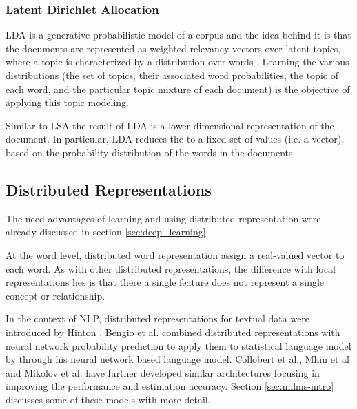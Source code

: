 \subsubsection{Latent Dirichlet Allocation}
 \label{sec:rel_lda}
\ac{LDA} is a generative probabilistic model of a corpus and the
idea behind it is that the documents are represented as weighted relevancy
vectors over latent topics, where a topic is characterized by a distribution over
words \cite{Blei:2003:LDA:944919.944937}.
Learning the various distributions (the set of topics, their associated word
probabilities, the topic of each word, and the particular topic mixture of
each document) is the objective of applying this topic modeling.

Similar to \ac{LSA} the result of \ac{LDA} is a lower dimensional
representation of the document. In particular, LDA
reduces the  to a fixed set of values  (i.e. a vector),  based on the
probability distribution of the words in the documents.

 \subsection{Distributed Representations}
 \label{sec:dis_rep}
The need advantages of  learning and using  distributed representation were already discussed in section \ref{sec:deep_learning}.

At the word level, distributed word representation assign a real-valued vector
to each word. As with other distributed representations, the  difference with local representations lies  is that there a single 
feature does not represent a single concept or relationship.

In the context of \ac{NLP},  distributed representations for textual data were
introduced by Hinton \cite{hinton:learndistrep}. 
 Bengio et al. \cite{Bengio:2008} combined distributed representations with neural network probability prediction  to apply them  to
statistical language model by through his
neural network based language model. Collobert  et al.\cite{collobert:2008}, Mhin et
al \cite{Mnih08ascalable} and
Mikolov et al.  \cite{conf/interspeech/MikolovKBCK10,conf/icassp/MikolovKBGC09} have further developed similar architectures focusing in improving the performance and estimation accuracy. Section \ref{sec:nnlms-intro} discusses some of these models with more detail.




